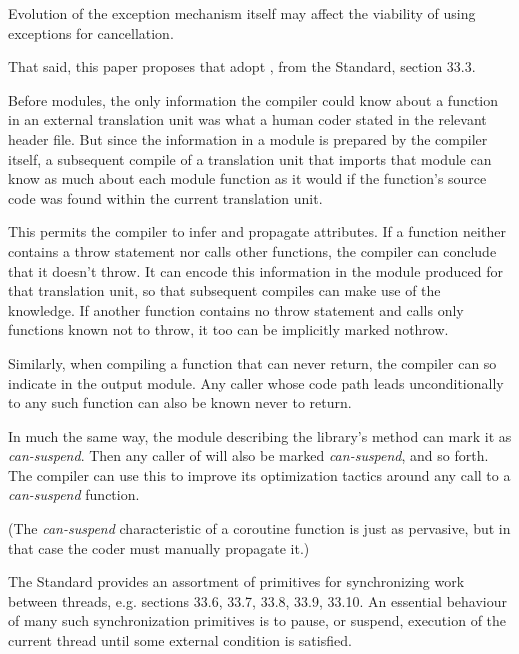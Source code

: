Evolution of the exception mechanism itself\cite{P0709R4} may affect the
viability of using exceptions for cancellation.

That said, this paper proposes that \fiber
adopt ,  from the
Standard\cite{Standard}, section 33.3.


Before modules, the only information the compiler could know about a function
in an external translation unit was what a human coder stated in the relevant
header file. But since the information in a module is prepared by the compiler
itself, a subsequent compile of a translation unit that imports that module
can know as much about each module function as it would if the function's
source code was found within the current translation unit.

This permits the compiler to infer and propagate attributes. If a function
neither contains a throw statement nor calls other functions, the compiler can
conclude that it doesn't throw. It can encode this information in the module
produced for that translation unit, so that subsequent compiles can make use
of the knowledge. If another function contains no throw statement and calls
only functions known not to throw, it too can be implicitly marked nothrow.

Similarly, when compiling a function that can never return, the compiler can
so indicate in the output module. Any caller whose code path leads
unconditionally to any such function can also be known never to return.

In much the same way, the module describing the
library's \fiber\cpp{::}\resumewith method can mark it as \emph{can-suspend}.
Then any caller of \resumewith will also be marked \emph{can-suspend}, and so
forth. The compiler can use this to improve its optimization tactics around
any call to a \emph{can-suspend} function.

(The \emph{can-suspend} characteristic of a  coroutine function
is just as pervasive, but in that case the coder must manually propagate it.)


The Standard\cite{Standard} provides an assortment of primitives for
synchronizing work between threads, e.g. sections 33.6, 33.7, 33.8, 33.9,
33.10. An essential behaviour of many such synchronization primitives is to
pause, or suspend, execution of the current thread until some external
condition is satisfied.

